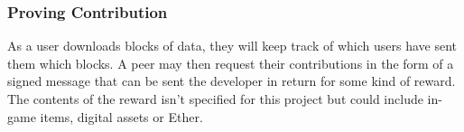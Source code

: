 \subsubsection*{Proving Contribution}

As a user downloads blocks of data, they will keep track of which users have sent them which blocks. A peer may then request their contributions in the form of a signed message that can be sent the developer  in return for some kind of reward. The contents of the reward isn't specified for this project but could include in-game items, digital assets or Ether.